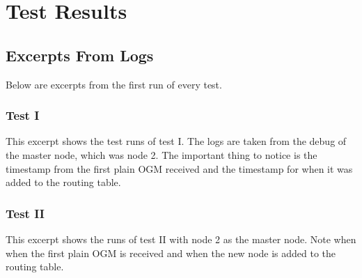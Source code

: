 \chapter{Test Results}
\label{appendix_tests}



\section{Excerpts From Logs}
Below are excerpts from the first run of every test.

\subsection{Test I}
This excerpt shows the test runs of test I. The logs are taken from the debug of the master node, which was node 2. The important thing to notice is the timestamp from the first plain OGM received and the timestamp for when it was added to the routing table.
\\


\subsection{Test II}
This excerpt shows the runs of test II with node 2 as the master node. Note when when the first plain OGM is received and when the new node is added to the routing table.
\\


